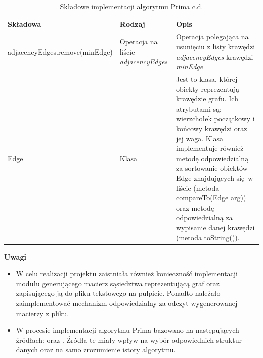 \begin{table}[!hbp]
	\hspace{-60pt}
	\begin{tabular}{|C{5cm}|C{3cm}|C{9cm}|} \hline
		\textbf{Składowa}& \textbf{Rodzaj}& \textbf{Opis}\\ \hline
		adjacencyEdges.remove(minEdge) & Operacja na liście \emph{adjacencyEdges} & Operacja polegająca na usunięciu z listy krawędzi \emph{adjacencyEdges} krawędzi \emph{minEdge}\\ \hline
		Edge & Klasa &Jest to klasa, której obiekty reprezentują krawędzie grafu. Ich atrybutami są: wierzchołek początkowy i końcowy krawędzi oraz jej waga. Klasa implementuje również metodę odpowiedzialną za sortowanie obiektów Edge znajdujących się w liście (metoda compareTo(Edge arg)) oraz metodę odpowiedzialną za wypisanie danej krawędzi (metoda toString()).\\ \hline
		
	\end{tabular}
	\caption{Składowe implementacji algorytmu Prima c.d.}
	\label{skladowe2}
\end{table}


\begin{center}
\textbf{Uwagi}
\end{center}
\begin{itemize}
\item W celu realizacji projektu zaistniała również konieczność implementacji modułu generującego macierz sąsiedztwa reprezentującą graf oraz zapisującego ją do pliku tekstowego na pulpicie. 
Ponadto należało zaimplementować mechanizm odpowiedzialny za odczyt wygenerowanej macierzy z pliku.
\item W procesie implementacji algorytmu Prima bazowano na następujących źródłach: \cite{prim} oraz \cite{prim3}. Źródła te miały wpływ na wybór odpowiednich struktur danych oraz na samo zrozumienie istoty algorytmu.
\end{itemize}


\newpage